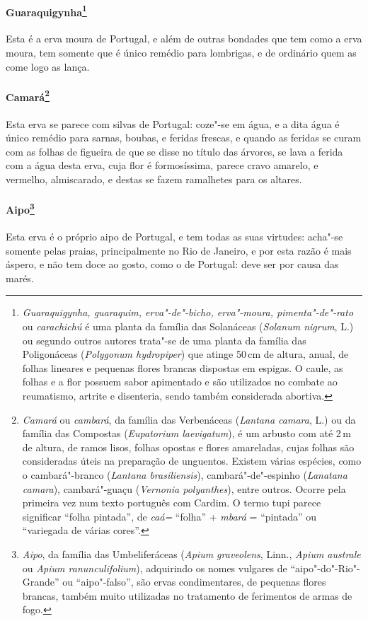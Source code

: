 \paragraph{Guaraquigynha\footnote{ \textit{Guaraquigynha, guaraquim,
erva"-de"-bicho, erva"-moura, pimenta"-de"-rato} ou \textit{carachichú} 
é uma planta da família das Solanáceas (\textit{Solanum nigrum}, L.) ou
segundo outros autores trata"-se de uma planta da família das
Poligonáceas (\textit{Polygonum hydropiper}) que atinge 50\,cm de
altura, anual, de folhas lineares e pequenas flores brancas dispostas
em espigas. O caule, as folhas e a flor possuem sabor apimentado e são
utilizados no combate ao reumatismo, artrite e disenteria, sendo também
considerada abortiva.}} Esta é a erva moura de Portugal, e
além de outras bondades que tem como a erva moura, tem somente que é
único remédio para lombrigas, e de ordinário quem as come logo as lança. 

\paragraph{Camará\footnote{ \textit{Camará} ou \textit{cambará}, da
família das Verbenáceas (\textit{Lantana camara}, L.) ou da família das
Compostas (\textit{Eupatorium laevigatum}), é um arbusto com até 2\,m de
altura, de ramos lisos, folhas opostas e flores amareladas, cujas
folhas são consideradas úteis na preparação de unguentos. Existem várias
espécies, como o cambará"-branco (\textit{Lantana brasiliensis}), 
cambará"-de"-espinho (\textit{Lanatana camara}), cambará"-guaçu
(\textit{Vernonia polyanthes}), entre outros. Ocorre pela primeira vez
num texto português com Cardim. O termo tupi parece significar ``folha
pintada'', de \textit{caá=} ``folha'' + \textit{mbará} = ``pintada'' ou 
``variegada de várias cores''.}} Esta erva se parece com silvas
de Portugal: coze"-se em água, e a dita água é único remédio para
sarnas, boubas, e feridas frescas, e quando as feridas se curam com as
folhas de figueira de que se disse no título das árvores, se lava a
ferida com a água desta erva, cuja flor é formosíssima, parece cravo
amarelo, e vermelho, almiscarado, e destas se fazem ramalhetes para os altares.

\paragraph{Aipo\footnote{ \textit{Aipo}, da família das Umbeliferáceas
(\textit{Apium graveolens}, Linn., \textit{Apium australe} ou
\textit{Apium ranunculifolium}), adquirindo os nomes vulgares de
``aipo"-do"-Rio"-Grande'' ou ``aipo"-falso'', são ervas condimentares, de
pequenas flores brancas, também muito utilizadas no tratamento de
ferimentos de armas de fogo.}} Esta erva é o próprio aipo
de Portugal, e tem todas as suas virtudes: acha"-se somente pelas
praias, principalmente no Rio de Janeiro, e por esta razão é mais
áspero, e não tem doce ao gosto, como o de Portugal: deve ser por causa
das marés. 

